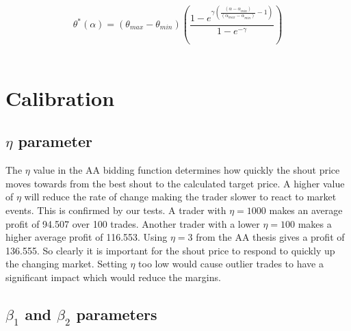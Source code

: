 \documentclass[preprint]{acm_proc_article-sp} %
\begin{document}
\begin{equation}
  \theta^*(\alpha) = (\theta_{max}-\theta_{min})
  \left(\frac{1-e^{\gamma\left(\frac{(\alpha-\alpha_{min})}{(\alpha_{max}
  -\alpha_{min})}-1\right)}}{1-e^{-\gamma}}\right)
  \label{thetastar}
\end{equation}\\



\section{Calibration} \label{sec:calibration}
\subsection{$\eta$ parameter} \label{sec:calibration_eta}
The $\eta$ value in the AA bidding function determines how quickly the shout
price moves towards from the best shout to the calculated target price. A
higher value of $\eta$ will reduce the rate of change making the trader slower
to react to market events. This is confirmed by our tests. A trader with $\eta
= 1000$ makes an average profit of 94.507 over 100 trades. Another trader with
a lower $\eta = 100$ makes a higher average profit of 116.553. Using $\eta = 3$
from the AA thesis \cite{AA_thesis} gives a profit of 136.555. So clearly it is important for the
shout price to respond to quickly up the changing market. Setting $\eta$ too
low would cause outlier trades to have a significant impact which would reduce
the margins.\\



\subsection{$\beta_1$ and $\beta_2$ parameters} \label{sec:calibration_beta}
\end{document}
